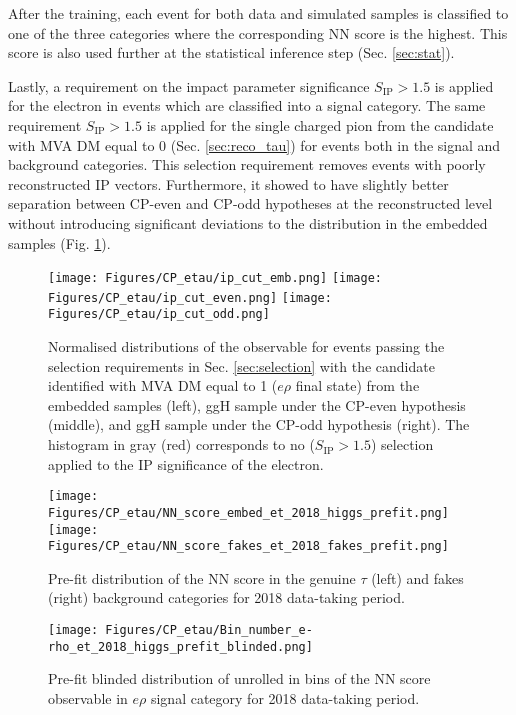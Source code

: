 After the training, each event for both data and simulated samples is classified to one of the three categories where the corresponding NN score is the highest. This score is also used further at the statistical inference step (Sec. \ref{sec:stat}). 

Lastly, a requirement on the impact parameter significance $S_\text{IP} > 1.5$ is applied for the electron in events which are classified into a signal category. The same requirement $S_\text{IP} > 1.5$ is applied for the single charged pion from the \tauh candidate with MVA DM equal to 0 (Sec. \ref{sec:reco_tau}) for events both in the signal and background categories. This selection requirement removes events with poorly reconstructed IP vectors. Furthermore, it showed to have slightly better separation between CP-even and CP-odd hypotheses at the reconstructed level without introducing significant deviations to the \phicp distribution in the embedded samples (Fig. \ref{fig:ip_cut}).  

\begin{figure}[!t]
    \centering
    \texttt{[image: Figures/CP\_etau/ip\_cut\_emb.png]}
    \texttt{[image: Figures/CP\_etau/ip\_cut\_even.png]}
    \texttt{[image: Figures/CP\_etau/ip\_cut\_odd.png]}
    \caption{Normalised distributions of the \phicp observable for events passing the selection requirements in Sec. \ref{sec:selection} with the \tauh candidate identified with MVA DM equal to 1 ($e\rho$ final state) from the embedded samples (left), ggH sample under the CP-even hypothesis (middle), and ggH sample under the CP-odd hypothesis (right). The histogram in gray (red) corresponds to no ($S_\text{IP} > 1.5$) selection applied to the IP significance of the electron.}
    \label{fig:ip_cut}
\end{figure}

\begin{figure}[!t]
    \centering
    \texttt{[image: Figures/CP\_etau/NN\_score\_embed\_et\_2018\_higgs\_prefit.png]}
    \texttt{[image: Figures/CP\_etau/NN\_score\_fakes\_et\_2018\_fakes\_prefit.png]}
    \caption{Pre-fit distribution of the NN score in the genuine $\tau$ (left) and fakes (right) background categories for 2018 data-taking period.}
    \label{fig:bkgr_cat_prefit}
\end{figure}

\begin{figure}[H]
    \centering
    \texttt{[image: Figures/CP\_etau/Bin\_number\_e-rho\_et\_2018\_higgs\_prefit\_blinded.png]}
    \caption{Pre-fit blinded distribution of unrolled in bins of the NN score \phicp observable in $e\rho$ signal category for 2018 data-taking period.}
    \label{fig:sig_cat_prefit}
\end{figure}


